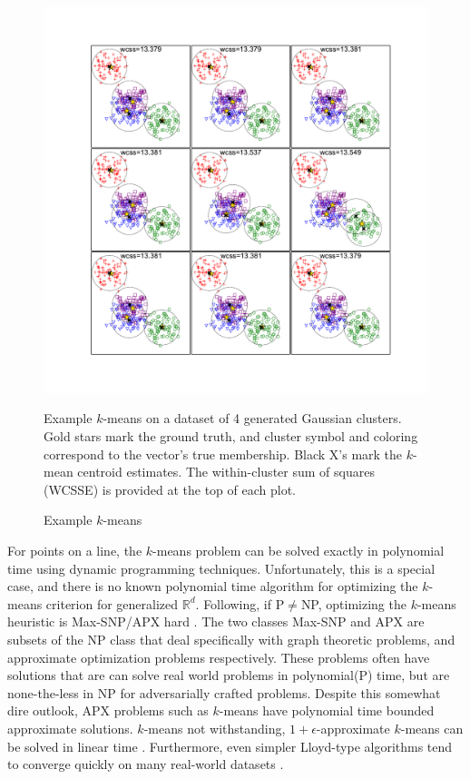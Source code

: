 \begin{figure}
    \centerline{\includegraphics[width=1\textwidth]{figs/kmeanex}}
    \caption{Example $k$-means}{Example $k$-means on a dataset of 4 generated Gaussian clusters.  Gold stars mark the ground truth, and
      cluster symbol and coloring correspond to the vector's true membership.  Black X's mark the $k$-mean centroid
      estimates. The within-cluster sum of squares (WCSSE) is provided at the top of each plot.}\label{kmex}
\end{figure}

For points on a line, the $k$-means problem can be solved exactly in polynomial time using dynamic programming
techniques.  Unfortunately, this is a special case, and there is no known polynomial time algorithm for optimizing the
$k$-means criterion for generalized $\mathbb{R}^d$.  Following, if P$\neq$NP, optimizing the $k$-means heuristic is
Max-SNP/APX hard \cite{dasgupta08,Mahajan09}.  The two classes Max-SNP and APX are subsets of the NP class that deal
specifically with graph theoretic problems, and approximate optimization problems respectively.  These problems 
often have solutions that are can solve real world problems in polynomial(P) time, but are none-the-less in NP
for adversarially crafted problems.
Despite this somewhat dire outlook, APX problems such as $k$-means have
polynomial time bounded approximate solutions.  $k$-means not withstanding, $1+\epsilon$-approximate $k$-means can be
solved in linear time \cite{kumar}.  Furthermore, even simpler Lloyd-type algorithms tend to converge quickly on many
real-world datasets \cite{Jain}.

